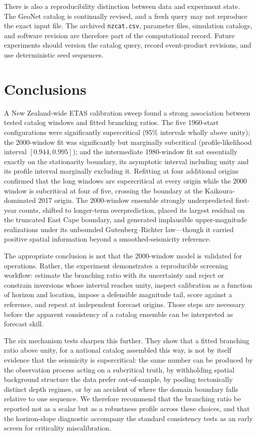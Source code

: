 \documentclass[12pt]{article}
\begin{document}
There is also a reproducibility distinction between data and experiment state.
The GeoNet catalog is continually revised, and a fresh query may not reproduce
the exact input file. The archived \texttt{nzcat.csv}, parameter files,
simulation catalogs, and software revision are therefore part of the
computational record. Future experiments should version the catalog query,
record event-product revisions, and use deterministic seed sequences.

\section*{Conclusions}

A New Zealand-wide ETAS calibration sweep found a strong association between
tested catalog windows and fitted branching ratios. The five 1960-start
configurations were significantly supercritical (95\% intervals wholly above
unity); the 2000-window fit was significantly but marginally subcritical
(profile-likelihood interval $[0.944,0.995]$); and the intermediate 1980-window
fit sat essentially exactly on the stationarity boundary, its asymptotic interval
including unity and its profile interval marginally excluding it. Refitting at four
additional origins confirmed that the long windows are supercritical at every
origin while the 2000 window is subcritical at four of five, crossing the
boundary at the Kaikoura-dominated 2017 origin. The 2000-window ensemble
strongly underpredicted first-year counts, shifted to longer-term
overprediction, placed its largest residual on the truncated East Cape boundary,
and generated implausible upper-magnitude realizations under its unbounded
Gutenberg--Richter law---though it carried positive spatial information beyond a
smoothed-seismicity reference.

The appropriate conclusion is not that the 2000-window model is validated for
operations. Rather, the experiment demonstrates a reproducible screening
workflow: estimate the branching ratio with its uncertainty and reject or
constrain inversions whose interval reaches unity, inspect calibration as a
function of horizon and location, impose a defensible magnitude tail, score
against a reference, and repeat at independent forecast origins. Those steps are
necessary before the apparent consistency of a catalog ensemble can be
interpreted as forecast skill.

The six mechanism tests sharpen this further. They show that a fitted branching
ratio above unity, for a national catalog assembled this way, is not by itself
evidence that the seismicity is supercritical: the same number can be produced by
the observation process acting on a subcritical truth, by withholding spatial
background structure the data prefer out-of-sample, by pooling tectonically
distinct depth regimes, or by an accident of where the domain boundary falls
relative to one sequence. We therefore recommend that the branching ratio be
reported not as a scalar but as a robustness profile across these choices, and
that the horizon-slope diagnostic accompany the standard consistency tests as an
early screen for criticality miscalibration.
\end{document}
